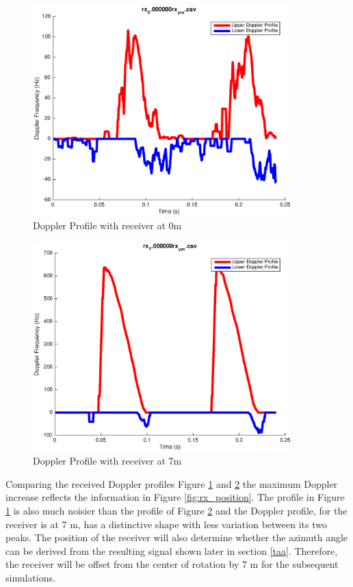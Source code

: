 \begin{figure}
	\begin{center}
		\includegraphics[width=10cm]{images/simulation/Doppler_Receiver_0m.eps}
		\caption{Doppler Profile with receiver at 0m}
		\label{fig:rx_position_0m}
	\end{center}
\end{figure}

\begin{figure}
	\begin{center}
		\includegraphics[width=10cm]{images/simulation/Doppler_Receiver_7m.eps}
		\caption{Doppler Profile with receiver at 7m}
		\label{fig:rx_position_7m}
	\end{center}
\end{figure}

Comparing the received Doppler profiles Figure \ref{fig:rx_position_0m} and \ref{fig:rx_position_7m} the maximum Doppler increase reflects the information in Figure \ref{fig:rx_position}. The profile in Figure \ref{fig:rx_position_0m} is also much noisier than the profile of Figure \ref{fig:rx_position_7m} and the Doppler profile, for the receiver is at 7 m, has a distinctive shape with less variation between its two peaks. The position of the receiver will also determine whether the azimuth angle can be derived from the resulting signal shown later in section \ref{taa}. Therefore, the receiver will be offset from the center of rotation by 7 m for the subsequent simulations.


